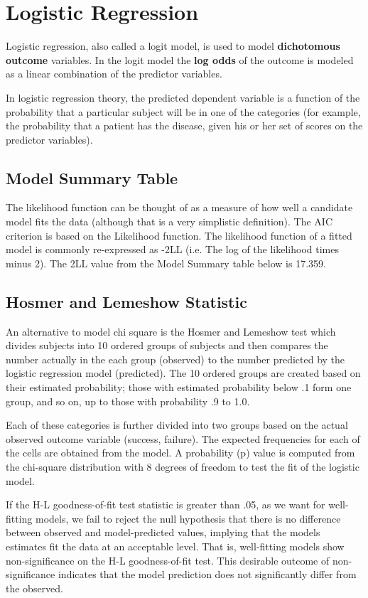 \documentclass[a4paper,12pt]{article}
\begin{document}
\section{Logistic Regression}
Logistic regression, also called a logit model, is used to model \textbf{dichotomous outcome} variables. 
In the logit model the \textbf{log odds} of the outcome is modeled as a linear combination of the predictor variables.

In logistic regression theory, the predicted dependent variable is a function of the probability that a particular subject will be in one of the categories (for example, the probability that a patient has the disease, given his or her set of scores on the predictor variables).



\subsection{Model Summary Table}


The likelihood function can be thought of as a measure of how well a candidate model fits the data (although that is a very simplistic definition). The AIC criterion is based on the Likelihood function.
The likelihood function of a fitted model is commonly re-expressed as -2LL (i.e. The log of the likelihood times minus 2). The 2LL value from the Model Summary table below is 17.359.



\subsection{Hosmer and Lemeshow  Statistic}
An alternative to model chi square is the Hosmer and Lemeshow test
which divides subjects into 10 ordered groups of subjects and then compares the number
actually in the each group (observed) to the number predicted by the logistic regression
model (predicted). The 10 ordered groups are created based on their estimated probability; those with estimated probability below .1 form one group, and so on, up to those with probability .9 to 1.0.

Each of these categories is further divided into two groups based on the actual observed outcome variable (success, failure). The expected frequencies for each of the cells are obtained from the model. A probability (p) value is
computed from the chi-square distribution with 8 degrees of freedom to test the fit of the logistic model.

If the H-L goodness-of-fit test statistic is greater than .05, as we want for well-fitting models, we fail to reject the null hypothesis that there is no difference between observed and model-predicted values, implying that the models estimates fit the data at an acceptable level. That is, well-fitting models show non-significance on the
H-L goodness-of-fit test. This desirable outcome of non-significance indicates that the
model prediction does not significantly differ from the observed.
\end{document}
